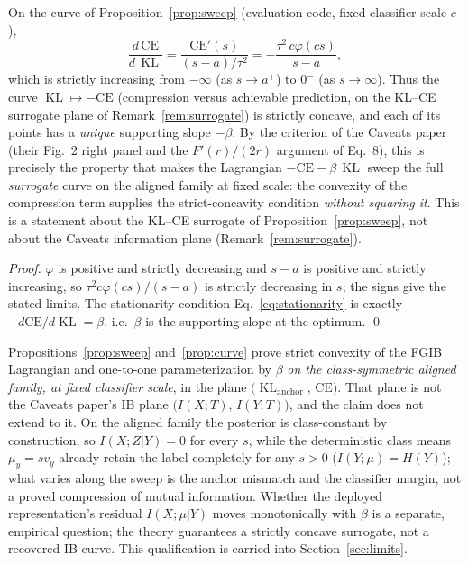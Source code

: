 \begin{proposition}\label{prop:curve}
On the curve of Proposition~\ref{prop:sweep} (evaluation code, fixed classifier scale $c$),
\begin{equation}
\frac{d\,\mathrm{CE}}{d\,\operatorname{KL}}
= \frac{\mathrm{CE}'(s)}{(s-a)/\tau^2}
= -\frac{\tau^2\,c\varphi(cs)}{s-a},
\label{eq:slope}
\end{equation}
which is strictly increasing from $-\infty$ (as $s \to a^+$) to $0^-$ (as $s \to
\infty$). Thus the curve $\operatorname{KL} \mapsto -\mathrm{CE}$ (compression versus
achievable prediction, on the KL--CE surrogate plane of
Remark~\ref{rem:surrogate}) is strictly concave, and each of its points has a \emph{unique}
supporting slope $-\beta$. By the criterion of the Caveats paper (their Fig.~2 right
panel and the $F'(r)/(2r)$ argument of Eq.~8), this is precisely the property that makes
the Lagrangian $-\mathrm{CE} - \beta\,\operatorname{KL}$ sweep the full \emph{surrogate}
curve on the aligned family at fixed scale: the convexity of the compression term
supplies the strict-concavity condition \emph{without squaring it}. This is a statement
about the KL--CE surrogate of Proposition~\ref{prop:sweep}, not about the Caveats
information plane (Remark~\ref{rem:surrogate}).
\end{proposition}

\begin{proof}
$\varphi$ is positive and strictly decreasing and $s-a$ is positive and strictly
increasing, so $\tau^2 c\varphi(cs)/(s-a)$ is strictly decreasing in $s$; the signs give
the stated limits. The stationarity condition Eq.~\eqref{eq:stationarity} is exactly
$-d\mathrm{CE}/d\operatorname{KL} = \beta$, i.e.\ $\beta$ is the supporting slope at the
optimum. \hfill\qed
\end{proof}

\begin{remark}\label{rem:surrogate}
Propositions~\ref{prop:sweep} and~\ref{prop:curve} prove strict convexity of the
FGIB Lagrangian and one-to-one parameterization by $\beta$ \emph{on the class-symmetric
aligned family, at fixed classifier scale}, in the plane
$\big(\operatorname{KL}_{\mathrm{anchor}},\, \mathrm{CE}\big)$. That plane is not the
Caveats paper's IB plane $\big(I(X;T),\, I(Y;T)\big)$, and the claim does not extend to
it. On the aligned family the posterior is class-constant by construction, so
$I(X;Z|Y) = 0$ for every $s$, while the deterministic class means $\mu_y = s v_y$
already retain the label completely for any $s > 0$ ($I(Y;\mu) = H(Y)$); what varies
along the sweep is the anchor mismatch and the classifier margin, not a proved
compression of mutual information. Whether the deployed representation's residual
$I(X;\mu|Y)$ moves monotonically with $\beta$ is a separate, empirical question; the
theory guarantees a strictly concave surrogate, not a recovered IB curve. This
qualification is carried into Section~\ref{sec:limits}.
\end{remark}

